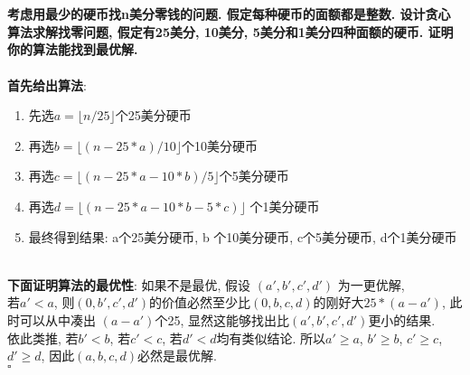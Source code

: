 \documentclass[UTF8]{article}
\newcommand{\jumpLine} {\hspace*{\fill} \\}
\newcommand{\floor}[1]{\lfloor#1\rfloor}
\begin{document}
\section{}
\textbf{考虑用最少的硬币找n美分零钱的问题. 假定每种硬币的面额都是整数. 设计贪心算法求解找零问题, 假定有25美分, 10美分, 5美分和1美分四种面额的硬币. 证明你的算法能找到最优解.}\\
\jumpLine
\textbf{首先给出算法}:
\begin{enumerate}[1. ]
	\item 先选$a=\floor{n/25}$个25美分硬币
	\item 再选$b=\floor{(n-25*a)/10}$个10美分硬币
	\item 再选$c=\floor{(n-25*a-10*b)/5}$个5美分硬币
	\item 再选$d=\floor{(n-25*a-10*b-5*c)}$ 个1美分硬币
	\item 最终得到结果: a个25美分硬币, b 个10美分硬币, c个5美分硬币, d个1美分硬币
\end{enumerate}
\jumpLine
\textbf{下面证明算法的最优性}:
如果不是最优, 假设 $(a',b',c',d')$ 为一更优解,\\
若$a'<a$, 则$(0,b',c',d')$的价值必然至少比$(0,b,c,d)$的刚好大$25*(a-a')$, 此时可以从中凑出 $(a-a')$个25, 显然这能够找出比$(a',b',c',d')$更小的结果.\\
依此类推, 若$b'<b$, 若$c'<c$, 若$d'<d$均有类似结论.
所以$a'\ge a$, $b'\ge b$, $c'\ge c$, $d'\ge d$, 因此$(a,b,c,d)$必然是最优解.\\
\hfill$\square$

%
\end{document}
